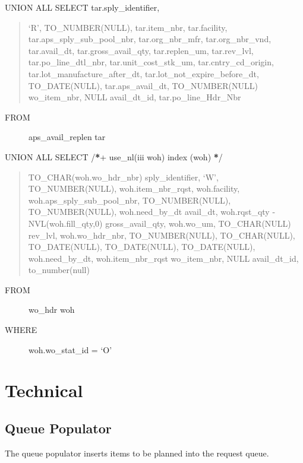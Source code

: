 \documentclass[letterpaper,10pt,english]{sphinxmanual}
\begin{document}
UNION ALL
SELECT tar.sply\_identifier,
\begin{quote}

`R',
TO\_NUMBER(NULL),
tar.item\_nbr,
tar.facility,
tar.aps\_sply\_sub\_pool\_nbr,
tar.org\_nbr\_mfr,
tar.org\_nbr\_vnd,
tar.avail\_dt,
tar.gross\_avail\_qty,
tar.replen\_um,
tar.rev\_lvl,
tar.po\_line\_dtl\_nbr,
tar.unit\_cost\_stk\_um,
tar.cntry\_cd\_origin,
tar.lot\_manufacture\_after\_dt,
tar.lot\_not\_expire\_before\_dt,
TO\_DATE(NULL),
tar.aps\_avail\_dt,
TO\_NUMBER(NULL)      wo\_item\_nbr,
NULL                                  avail\_dt\_id,
tar.po\_line\_Hdr\_Nbr
\end{quote}
\begin{description}
\item[{FROM}] \leavevmode
aps\_avail\_replen  tar

\end{description}

UNION ALL
SELECT /{\color{red}\bfseries{}*}+ use\_nl(iii woh) index (woh) {\color{red}\bfseries{}*}/
\begin{quote}

TO\_CHAR(woh.wo\_hdr\_nbr)     sply\_identifier,
`W',
TO\_NUMBER(NULL),
woh.item\_nbr\_rqst,
woh.facility,
woh.aps\_sply\_sub\_pool\_nbr,
TO\_NUMBER(NULL),
TO\_NUMBER(NULL),
woh.need\_by\_dt       avail\_dt,
woh.rqst\_qty - NVL(woh.fill\_qty,0)  gross\_avail\_qty,
woh.wo\_um,
TO\_CHAR(NULL)       rev\_lvl,
woh.wo\_hdr\_nbr,
TO\_NUMBER(NULL),
TO\_CHAR(NULL),
TO\_DATE(NULL),
TO\_DATE(NULL),
TO\_DATE(NULL),
woh.need\_by\_dt,
woh.item\_nbr\_rqst      wo\_item\_nbr,
NULL                                  avail\_dt\_id,
to\_number(null)
\end{quote}
\begin{description}
\item[{FROM}] \leavevmode
wo\_hdr   woh

\item[{WHERE}] \leavevmode
woh.wo\_stat\_id  = `O'

\end{description}


\chapter{Technical}
\label{APS/Technical:technical}\label{APS/Technical::doc}

\section{Queue Populator}
\label{APS/Technical:queue-populator}
The queue populator inserts items to be planned into the request queue.
\end{document}
